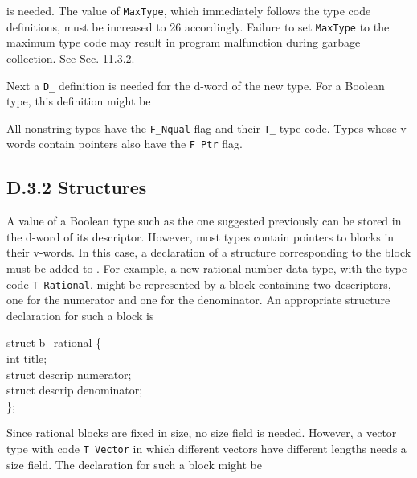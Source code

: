 
\noindent is needed. The value of \texttt{MaxType}, which immediately follows
the type code definitions, must be increased to 26 accordingly.
Failure to set \texttt{MaxType} to the maximum type code may result in
program malfunction during garbage collection. See Sec. 11.3.2.

Next a \texttt{D\_} definition is needed for the d-word of the new type.
For a Boolean type, this definition might be


\noindent
All nonstring types have the \texttt{F\_Nqual} flag and their \texttt{T\_}
type code. Types whose v-words contain pointers also have the
\texttt{F\_Ptr} flag.

\subsection[D.3.2 Structures]{D.3.2 Structures}

A value of a Boolean type such as the one suggested previously can be
stored in the d-word of its descriptor. However, most types contain
pointers to blocks in their v-words. In this case, a declaration of a
structure corresponding to the block must be added to .
For example, a new rational number data type, with the type code
\texttt{T\_Rational}, might be represented by a block containing two
descriptors, one for the numerator and one for the denominator. An
appropriate structure declaration for such a block is

\goodbreak
\begin{iconcode}
struct b\_rational \{\\
\>int title;\\
\>struct descrip numerator;\\
\>struct descrip denominator;\\
\};
\end{iconcode}

Since rational blocks are fixed in size, no size field is needed. However,
a vector type with code \texttt{T\_Vector} in which different vectors have
different lengths needs a size field. The declaration for such a block
might be

